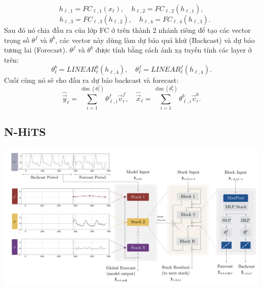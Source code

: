 \[{h}_{\ell,1} = FC_{\ell,1}({x}_{\ell}), \quad {h}_{\ell,2} = FC_{\ell,2}({h}_{\ell,1}),\] 
\[ \quad {h}_{\ell,3} = FC_{\ell,3}({h}_{\ell,2}), \quad {h}_{\ell,4} = FC_{\ell,4}({h}_{\ell,3}).\] 
Sau đó nó chia đầu ra của lớp FC ở trên thành 2 nhánh riêng để tạo các vector trọng số \(\theta^f\) và \(\theta^b\), các vector này dùng làm dự báo quá khứ (Backcast) và dự báo tương lai (Forecast). \(\theta^f\) và \(\theta^b\) được tính bằng cách ánh xạ tuyến tính các layer ở trên:\\
\[\theta^b_{\ell} = LINEAR_{\ell}^{b}({h}_{\ell,4}), \quad \theta^f_{\ell} = LINEAR_{\ell}^{f}({h}_{\ell,4}).\]
Cuối cùng nó sẽ cho đầu ra dự báo backcast và forecast:
\[\widehat{\vec{y}}_{\ell} = \sum_{i=1}^{\dim(\theta^f_{\ell})} \theta^f_{\ell,i} \vec{v}^f_{i}, \quad  \widehat{\vec{x}}_{\ell} = \sum_{i=1}^{\dim(\theta^b_{\ell})} \theta^b_{\ell,i} \vec{v}^b_{i}.\]
\subsection{N-HiTS}
\begin{minipage}{0.45\textwidth}
\centering
\includegraphics[width=1\textwidth]{resources/chapter-4/nhits-1.png}
\end{minipage}


